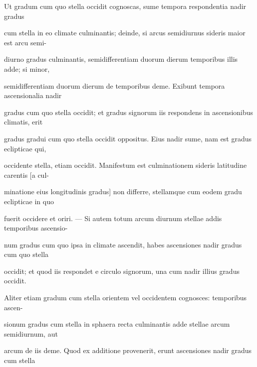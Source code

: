 \documentclass[11pt]{article}
\begin{document}
\noindent\hypertarget{AB01-PDF0122-body-L016}{}Ut gradum cum quo stella occidit cognoscas, sume tempora respondentia nadir gradus\strut\par
\noindent\hypertarget{AB01-PDF0122-body-L017}{}cum stella in eo climate culminantis; deinde, si arcus semidiurnus sideris maior est arcu semi-\strut\par
\noindent\hypertarget{AB01-PDF0122-body-L018}{}diurno gradus culminantis, semidifferentiam duorum dierum temporibus illis adde; si minor,\strut\par
\noindent\hypertarget{AB01-PDF0122-body-L019}{}semidifferentiam duorum dierum de temporibus deme. Exibunt tempora ascensionalia nadir\strut\par
\noindent\hypertarget{AB01-PDF0122-body-L020}{}gradus cum quo stella occidit; et gradus signorum iis respondens in ascensionibus climatis, erit\strut\par
\noindent\hypertarget{AB01-PDF0122-body-L021}{}gradus gradui cum quo stella occidit oppositus. Eius nadir sume, nam est gradus eclipticae qui,\strut\par
\noindent\hypertarget{AB01-PDF0122-body-L022}{}occidente stella, etiam occidit. Manifestum est culminationem sideris latitudine carentis [a cul-\strut\par
\noindent\hypertarget{AB01-PDF0122-body-L023}{}minatione eius longitudinis gradus] non differre, stellamque cum eodem gradu eclipticae in quo\strut\par
\noindent\hypertarget{AB01-PDF0122-body-L024}{}fuerit occidere et oriri. — Si autem totum arcum diurnum stellae addis temporibus ascensio-\strut\par
\noindent\hypertarget{AB01-PDF0122-body-L025}{}num gradus cum quo ipsa in climate ascendit, habes ascensiones nadir gradus cum quo stella\strut\par
\noindent\hypertarget{AB01-PDF0122-body-L026}{}occidit; et quod iis respondet e circulo signorum, una cum nadir illius gradus occidit.\strut\par
\noindent\hypertarget{AB01-PDF0122-body-L027}{}Aliter etiam gradum cum stella orientem vel occidentem cognosces: temporibus ascen-\strut\par
\noindent\hypertarget{AB01-PDF0122-body-L028}{}sionum gradus cum stella in sphaera recta culminantis adde stellae arcum semidiurnum, aut\strut\par
\noindent\hypertarget{AB01-PDF0122-body-L029}{}arcum de iis deme. Quod ex additione provenerit, erunt ascensiones nadir gradus cum stella\strut\par
\end{document}
